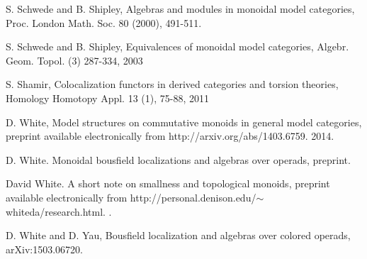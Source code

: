 \documentclass[11pt,reqno]{amsart}
\theoremstyle{definition}
\numberwithin{equation}{subsection}
\begin{document}
\begin{thebibliography}{AAAAAA}
S. Schwede and B. Shipley, Algebras and modules in monoidal model categories, Proc. London Math. Soc. 80 (2000), 491-511.

 S. Schwede and B. Shipley, Equivalences of monoidal model categories, Algebr. Geom. Topol. (3) 287-334, 2003

 S. Shamir, Colocalization functors in derived categories and torsion theories, Homology Homotopy Appl. 13 (1), 75-88, 2011



D. White, Model structures on commutative monoids in general model categories, preprint available electronically from http://arxiv.org/abs/1403.6759. 2014.


D. White. Monoidal bousfield localizations and algebras over operads, preprint.



David White.
\newblock A short note on smallness and topological monoids, preprint available
  electronically from http://personal.denison.edu/$\sim$whiteda/research.html.
.



D. White and D. Yau, Bousfield localization and algebras over colored operads, arXiv:1503.06720.



\end{thebibliography}
\end{document}

